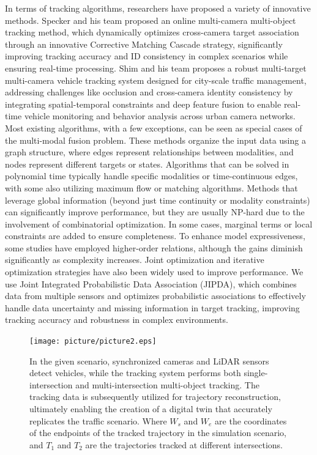 \documentclass[journal,twoside,web]{ieeecolor}
\begin{document}
In terms of tracking algorithms, researchers have proposed a variety of innovative methods.
Specker and his team proposed an online multi-camera multi-object tracking method, which dynamically optimizes cross-camera target association through an innovative Corrective Matching Cascade strategy, significantly improving tracking accuracy and ID consistency in complex scenarios while ensuring real-time processing\cite{Alpher24e}.
Shim and his team proposes a robust multi-target multi-camera vehicle tracking system designed for city-scale traffic management, addressing challenges like occlusion and cross-camera identity consistency by integrating spatial-temporal constraints and deep feature fusion to enable real-time vehicle monitoring and behavior analysis across urban camera networks\cite{Alpher21e}.
Most existing algorithms, with a few exceptions, can be seen as special cases of the multi-modal fusion problem. 
These methods organize the input data using a graph structure, where edges represent relationships between modalities, and nodes represent different targets or states. 
Algorithms that can be solved in polynomial time typically handle specific modalities or time-continuous edges, with some also utilizing maximum flow or matching algorithms. 
Methods that leverage global information (beyond just time continuity or modality constraints) can significantly improve performance, but they are usually NP-hard due to the involvement of combinatorial optimization. 
In some cases, marginal terms or local constraints are added to ensure completeness. 
To enhance model expressiveness, some studies have employed higher-order relations, although the gains diminish significantly as complexity increases. 
Joint optimization and iterative optimization strategies have also been widely used to improve performance.
We use Joint Integrated Probabilistic Data Association (JIPDA), which combines data from multiple sensors and optimizes probabilistic associations to effectively handle data uncertainty and missing information in target tracking, improving tracking accuracy and robustness in complex environments.

\begin{figure}[t]
	\centerline{\texttt{[image: picture/picture2.eps]}}
	\caption{In the given scenario, synchronized cameras and LiDAR sensors detect vehicles, while the tracking system performs both single-intersection and multi-intersection multi-object tracking. The tracking data is subsequently utilized for trajectory reconstruction, ultimately enabling the creation of a digital twin that accurately replicates the traffic scenario. Where \(W_{s}\) and \(W_{e}\) are the coordinates of the endpoints of the tracked trajectory in the simulation scenario, and \(T_{1}\) and \(T_{2}\) are the trajectories tracked at different intersections.}
	\label{fig:2}
\end{figure}
\end{document}
